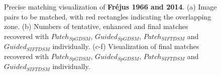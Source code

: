 \begin{figure}[htbp]
\begin{center}
{\begin{minipage}[t]{0.48\linewidth}
			\end{minipage}%
		}
		\caption{Precise matching visualization of \textbf{Fr{\'e}jus 1966 and 2014}. (a) Image pairs to be matched, with red rectangles indicating the overlapping zone. (b) Numbers of tentative, enhanced and final matches recovered with $Patch_{SpGDSM}$, $Guided_{SpGDSM}$, $Patch_{SIFTDSM}$ and $Guided_{SIFTDSM}$ individually. (c-f) Visualization of final matches recovered with $Patch_{SpGDSM}$, $Guided_{SpGDSM}$, $Patch_{SIFTDSM}$ and $Guided_{SIFTDSM}$ individually.}
		\label{MatchVizFrejus1966-2014}
	\end{center}
\end{figure} 


